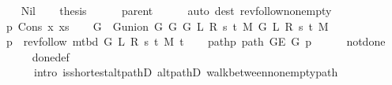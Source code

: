 \begin{isabellebody}
\ \ \isamarkupfalse%
\ Nil\isanewline
\ \ \isamarkupfalse%
\ {\isacharquery}{\kern0pt}thesis\isanewline
\ \ \ \ \isamarkupfalse%
\ parent\isanewline
\ \ \ \ \isamarkupfalse%
\ {\isacharparenleft}{\kern0pt}auto\ dest{\isacharcolon}{\kern0pt}\ rev{\isacharunderscore}{\kern0pt}follow{\isacharunderscore}{\kern0pt}non{\isacharunderscore}{\kern0pt}empty{\isacharparenright}{\kern0pt}\isanewline
{}\isamarkupfalse%
\isanewline
\ \ \isamarkupfalse%
\ p{\isacharcolon}{\kern0pt}\ {\isacharparenleft}{\kern0pt}Cons\ x\ xs{\isacharparenright}{\kern0pt}\isanewline
\ \ \isamarkupfalse%
\ {\isacharquery}{\kern0pt}G\ {\isacharequal}{\kern0pt}\ {\isachardoublequoteopen}G{\isachardot}{\kern0pt}union\ {\isacharparenleft}{\kern0pt}G{}\ G\ {\isacharparenleft}{\kern0pt}G{}\ L\ R\ s\ t\ M{\isacharparenright}{\kern0pt}{\isacharparenright}{\kern0pt}\ {\isacharparenleft}{\kern0pt}G{}\ L\ R\ s\ t\ M{\isacharparenright}{\kern0pt}{\isachardoublequoteclose}\isanewline
\ \ \isamarkupfalse%
\ {\isacharquery}{\kern0pt}p\ {\isacharequal}{\kern0pt}\ {\isachardoublequoteopen}rev{\isacharunderscore}{\kern0pt}follow\ {\isacharparenleft}{\kern0pt}m{\isacharunderscore}{\kern0pt}tbd\ G\ L\ R\ s\ t\ M{\isacharparenright}{\kern0pt}\ t{\isachardoublequoteclose}\isanewline
\ \ \isamarkupfalse%
\ path{\isacharunderscore}{\kern0pt}p{\isacharcolon}{\kern0pt}\ {\isachardoublequoteopen}path\ {\isacharparenleft}{\kern0pt}G{\isachardot}{\kern0pt}E\ {\isacharquery}{\kern0pt}G{\isacharparenright}{\kern0pt}\ {\isacharquery}{\kern0pt}p{\isachardoublequoteclose}\isanewline
\ \ \ \ \isamarkupfalse%
\ not{\isacharunderscore}{\kern0pt}done{\isacharunderscore}{\kern0pt}{}\isanewline
\ \ \ \ \isamarkupfalse%
\ done{\isacharunderscore}{\kern0pt}{}{\isacharunderscore}{\kern0pt}def\isanewline
\ \ \ \ \isamarkupfalse%
\isanewline
\ \ \ \ \ \ {\isacharparenleft}{\kern0pt}intro\ is{\isacharunderscore}{\kern0pt}shortest{\isacharunderscore}{\kern0pt}alt{\isacharunderscore}{\kern0pt}pathD{\isacharparenleft}{\kern0pt}{}{\isacharparenright}{\kern0pt}\ alt{\isacharunderscore}{\kern0pt}pathD{\isacharparenleft}{\kern0pt}{}{\isacharparenright}{\kern0pt}\ walk{\isacharunderscore}{\kern0pt}between{\isacharunderscore}{\kern0pt}nonempty{\isacharunderscore}{\kern0pt}path{\isacharparenleft}{\kern0pt}{}{\isacharparenright}{\kern0pt}{\isacharparenright}{\kern0pt}\isanewline

\end{isabellebody}
